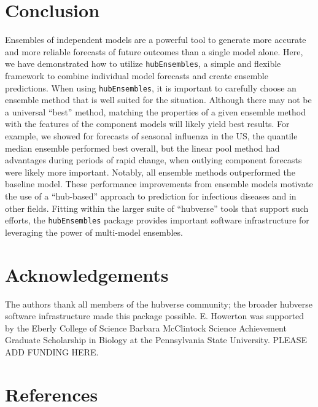 \documentclass[
]{article}
\begin{document}
\section{Conclusion}\label{sec-conclusions}

Ensembles of independent models are a powerful tool to generate more
accurate and more reliable forecasts of future outcomes than a single
model alone. Here, we have demonstrated how to utilize
\texttt{hubEnsembles}, a simple and flexible framework to combine
individual model forecasts and create ensemble predictions. When using
\texttt{hubEnsembles}, it is important to carefully choose an ensemble
method that is well suited for the situation. Although there may not be
a universal ``best'' method, matching the properties of a given ensemble
method with the features of the component models will likely yield best
results. For example, we showed for forecasts of seasonal influenza in
the US, the quantile median ensemble performed best overall, but the
linear pool method had advantages during periods of rapid change, when
outlying component forecasts were likely more important. Notably, all
ensemble methods outperformed the baseline model. These performance
improvements from ensemble models motivate the use of a ``hub-based''
approach to prediction for infectious diseases and in other fields.
Fitting within the larger suite of ``hubverse'' tools that support such
efforts, the \texttt{hubEnsembles} package provides important software
infrastructure for leveraging the power of multi-model ensembles.

\section{Acknowledgements}\label{acknowledgements}

The authors thank all members of the hubverse community; the broader
hubverse software infrastructure made this package possible. E. Howerton
was supported by the Eberly College of Science Barbara McClintock
Science Achievement Graduate Scholarship in Biology at the Pennsylvania
State University. PLEASE ADD FUNDING HERE.

\section*{References}\label{references}
\end{document}
